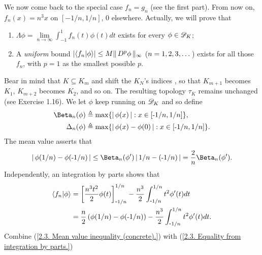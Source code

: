 We now come back to the special case $f_n = g_n$ (see the first part). %
From now on, $f_n(x) = n^3 x$ on $[\minus 1/n, 1/n]$, $0$ elsewhere. %
Actually, we will prove that 
%
  \renewcommand{\labelenumi}{(\alph{enumi})}
  \begin{enumerate}
    \item{
        $\Lambda\phi 
          = 
        \underset{n \to \infty}{\lim} \int_{\minus 1}^1 f_{n}(t)\phi(t)dt$ 
      exists for every $\phi\in{\mathscr D}_{K}$;
    }
    \item{
      A \textit{uniform} bound %
        $\lvert\bra{f_n}\ket{\phi}\rvert \leq M \| \,D^p \phi \, \|_{\infty}$ %
        ($n=1, 2, 3, \dots$) %
      exists for all those $f_n$, with $p=1$ as the smallest possible $p$.
    }
  \end{enumerate}
  \renewcommand{\labelenumi}{(\roman{enumi})}
%
%
Bear in mind that %
%
  $K \subseteq K_m$ %
%
and shift the $K_N$'s indices%
, so that %
%
  $K_{m+1}$ becomes $K_1$, $K_{m+2}$ becomes $K_2$, and so on. %
%
The resulting topology $\tau_K$ remains unchanged (see Exercise 1.16). %
%
We let $\phi$ keep running on ${\mathscr D}_K$ and so define %
%
  \begin{align}
    \Beta_{n}(\phi) 
      & 
        \Def  \max\set{\magnitude{\phi(x)}}{x \in [\minus 1/n, 1/n]}, \\
    \Delta_{n}(\phi) 
      & 
        \Def  \max\set{\magnitude{\phi(x) - \phi(0)}}{x \in [\minus 1/n, 1/n]}. 
  \end{align}
%
The mean value asserts that 
%
  \begin{align}\label{2.3. Mean value inequality (concrete).}
    \magnitude{ \phi(1/n) - \phi(\minus 1/n)} 
      \leq 
    \Beta_{n}(\phi')\magnitude{1/n - ({\minus}1/n)} 
      = 
    \frac{2}{n} \Beta_{n}(\phi').
  \end{align}
%
Independently, an integration by parts shows that %
%
  \begin{align}
    \bra{f_n}\ket{\phi}
      & =  
        \left[ \frac{n^3 t^2}{2} \phi(t) \right]^{1/n}_{\text{\small{-}} 1/n}
        - \frac{n^3}{2} \int_{\text{\small{-}} 1/n}^{1/n} t^{2} \phi'(t)dt\\ 
      \label{2.3. Equality from integration by parts.}
      & =  
        \frac{n}{2}\left(\phi(1/n) - \phi(\text{\small{-}} 1/n)\right)
        - \frac{n^3}{2} \int_{\text{\small{-}} 1/n}^{1/n} t^{2} \phi'(t)dt.
  \end{align}
Combine %
%
  (\ref{2.3. Mean value inequality (concrete).}) %
%
with %
  (\ref{2.3. Equality from integration by parts.})
